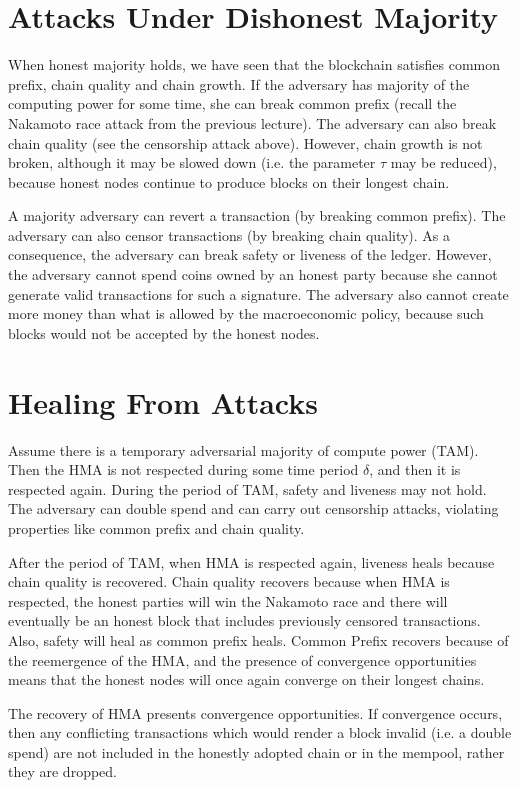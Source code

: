 \section{Attacks Under Dishonest Majority}
When honest majority holds, we have seen that the blockchain satisfies common prefix, chain quality and chain growth.
If the adversary has majority of the computing power for some time, she can break common prefix (recall the Nakamoto race attack from the previous lecture). The adversary can also break chain quality (see the censorship attack above).
However, chain growth is not broken, although it may be slowed down (i.e. the parameter $\tau$ may be reduced), because honest nodes continue to produce blocks on their longest chain.

A majority adversary can revert a transaction (by breaking common prefix). The adversary can also censor transactions (by breaking chain quality).
As a consequence, the adversary can break safety or liveness of the ledger.
However, the adversary cannot spend coins owned by an honest party because she cannot generate valid transactions for such a signature.
The adversary also cannot create more money than what is allowed by the macroeconomic policy, because such blocks would not be accepted by the honest nodes.

\section{Healing From Attacks}
Assume there is a temporary adversarial majority of compute power (TAM). Then the HMA is not respected during some time period $\delta$, and then it is respected again.
During the period of TAM, safety and liveness may not hold. The adversary can double spend and can carry out censorship attacks, violating properties like common prefix and chain quality.

After the period of TAM, when HMA is respected again, liveness heals because chain quality is recovered. Chain quality recovers because when HMA is respected, the honest parties will win the Nakamoto race and there will eventually be an honest block that includes previously censored transactions. Also, safety will heal as common prefix heals. Common Prefix recovers because of the reemergence of the HMA, and the presence of convergence opportunities means that the honest nodes will once again converge on their longest chains.

The recovery of HMA presents convergence opportunities. If convergence occurs, then any conflicting transactions which would render a block invalid (i.e. a double spend) are not included in the
honestly adopted chain
or in the mempool,
rather they are dropped.

